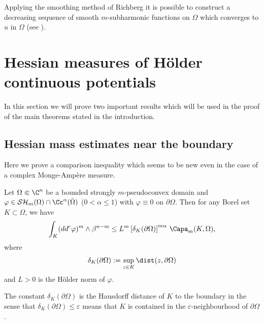 Applying the smoothing method of Richberg it is possible to construct a decreasing sequence of smooth $m$-subharmonic functions on $\Omega$ which converges to $u$ in $ \Omega$ (see \cite{P14}).

\section{Hessian measures of Hölder continuous potentials}\label{sec:4}

In this section we will prove two important results which will be used in the proof of the main theorems stated in the introduction.

\subsection{Hessian mass estimates near the boundary}

Here we prove a comparison inequality which seems to be new even in the case of a complex Monge-Ampère measure.

\begin{lemma} \label{lem:ComparisonIneq}
Let $\Omega \Subset \C^n$ be a bounded strongly $m$-pseudoconvex domain and $\varphi \in \mathcal{SH}_m(\Omega)\cap \Cc^{\alpha} (\bar{\Omega})$ ($0 < \alpha \leq 1$) with $\varphi \equiv 0$ on $\partial \Omega$. Then for any Borel set $K \subset \Omega$, we have
\[
\int_K (dd^c\varphi)^m\wedge\beta^{n-m} \leq L^m \left[\delta_K (\partial \Omega)\right]^{ m \alpha} \, \Capa_m (K,\Omega),
\]
where
\[
\delta_K (\partial \Omega):= \sup_{z \in K} \dist (z, \partial \Omega)
\]
and $L > 0$ is the Hölder norm of $\varphi$.
\end{lemma}
The constant $\delta_K (\partial \Omega)$ is the Hausdorff distance of $K$ to the boundary in the sense that $\delta_K (\partial \Omega) \leq \varepsilon $ means that $K$ is contained in the $\varepsilon$-neighbourhood of $\partial \Omega$.

